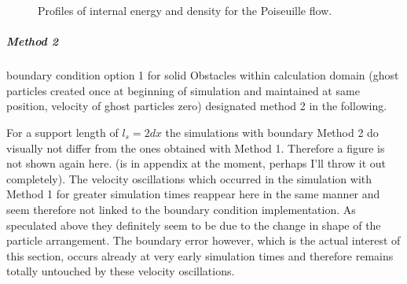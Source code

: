 \documentclass[11pt,a4paper,twoside]{report}
\begin{document}
  
\begin{figure}[!htbp]
\centering
\label{fig:Porosities_LinearWall_domainEdgeBC_EnergyDensity}

\caption[Energy and Density Profiles Poiseuille]{Profiles of internal energy and density for the Poiseuille flow.}

\end{figure}



\subparagraph{Method 2} 
boundary condition option 1 for solid Obstacles within calculation domain
(ghost particles created once at beginning of simulation and maintained at same position, velocity of ghost particles zero) designated method 2 in the following.

For a support length of $l_s=2dx$ the simulations with boundary Method 2 do visually not differ from the ones obtained with Method 1. Therefore a figure is not shown again here. (is in appendix at the moment, perhaps I'll throw it out completely). The velocity oscillations which occurred in the simulation with Method 1 for greater simulation times reappear here in the same manner and seem therefore not linked to the boundary condition implementation. As speculated above they definitely seem to be due to the change in shape of the particle arrangement. The boundary error however, which is the actual interest of this section, occurs already at very early simulation times and therefore remains totally untouched by these velocity oscillations.
\end{document}
